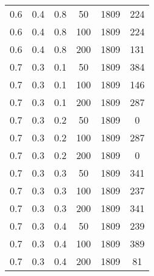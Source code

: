 \begin{table}[h]
\begin{center}
\begin{threeparttable}
\begin{tabular}{|c|c|c|c|c|c|}
	   \hline
		0.6 &  0.4 &  0.8 &   50 &  1809 &   224 \\
		0.6 &  0.4 &  0.8 &  100 &  1809 &   224 \\
		0.6 &  0.4 &  0.8 &  200 &  1809 &   131 \\
	   \hline
		0.7 &  0.3 &  0.1 &   50 &  1809 &   384 \\
		0.7 &  0.3 &  0.1 &  100 &  1809 &   146 \\
		0.7 &  0.3 &  0.1 &  200 &  1809 &   287 \\
	   \hline
		0.7 &  0.3 &  0.2 &   50 &  1809 &     0 \\
		0.7 &  0.3 &  0.2 &  100 &  1809 &   287 \\
		0.7 &  0.3 &  0.2 &  200 &  1809 &     0 \\
	   \hline
		0.7 &  0.3 &  0.3 &   50 &  1809 &   341 \\
		0.7 &  0.3 &  0.3 &  100 &  1809 &   237 \\
		0.7 &  0.3 &  0.3 &  200 &  1809 &   341 \\
	   \hline
		0.7 &  0.3 &  0.4 &   50 &  1809 &   239 \\
		0.7 &  0.3 &  0.4 &  100 &  1809 &   389 \\
		0.7 &  0.3 &  0.4 &  200 &  1809 &    81 \\
	   \hline
        		\end{tabular}
        \end{threeparttable}
	\end{center}
\end{table}
